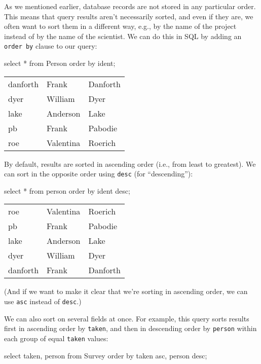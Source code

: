 \documentclass{book}
\begin{document}
As we mentioned earlier, database records are not stored in any
particular order. This means that query results aren't necessarily
sorted, and even if they are, we often want to sort them in a different
way, e.g., by the name of the project instead of by the name of the
scientist. We can do this in SQL by adding an \texttt{order by} clause
to our query:

\begin{VerbIn}
select * from Person order by ident;
\end{VerbIn}

\begin{tabular}{lll}
danforth & Frank & Danforth \\
dyer & William & Dyer \\
lake & Anderson & Lake \\
pb & Frank & Pabodie \\
roe & Valentina & Roerich \\
\end{tabular}

By default, results are sorted in ascending order (i.e., from least to
greatest). We can sort in the opposite order using \texttt{desc} (for
``descending''):

\begin{VerbIn}
select * from person order by ident desc;
\end{VerbIn}

\begin{tabular}{lll}
roe & Valentina & Roerich \\
pb & Frank & Pabodie \\
lake & Anderson & Lake \\
dyer & William & Dyer \\
danforth & Frank & Danforth \\
\end{tabular}

(And if we want to make it clear that we're sorting in ascending order,
we can use \texttt{asc} instead of \texttt{desc}.)

We can also sort on several fields at once. For example, this query
sorts results first in ascending order by \texttt{taken}, and then in
descending order by \texttt{person} within each group of equal
\texttt{taken} values:

\begin{VerbIn}
select taken, person from Survey order by taken asc, person desc;
\end{VerbIn}
\end{document}
